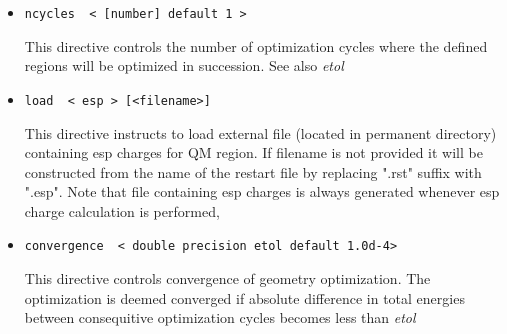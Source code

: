 \begin{itemize}
\item
\begin{verbatim}
ncycles  < [number] default 1 >
\end{verbatim}

This directive controls the number of optimization cycles where the defined regions will be optimized in succession.
See also {\it etol}

\item
\begin{verbatim}
load  < esp > [<filename>]
\end{verbatim}

This directive instructs to load external file (located in permanent directory) containing esp charges for QM region.
If filename is not provided it will be constructed from the name of the restart file by replacing ".rst" 
suffix with ".esp".
Note that file containing esp charges is always generated whenever esp charge calculation is performed,

\item
\begin{verbatim}
convergence  < double precision etol default 1.0d-4> 
\end{verbatim}

This directive controls convergence of geometry optimization. The optimization is deemed converged if absolute difference in 
total energies between consequitive optimization cycles becomes less than 
{\it etol} 



\end{itemize}



